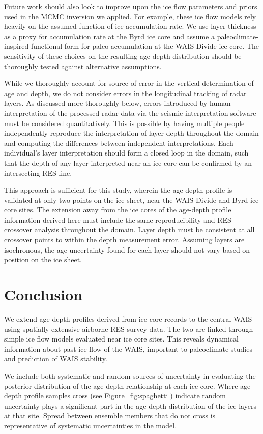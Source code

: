\documentclass[12pt]{article}
\begin{document}
Future work should also look to improve upon the ice flow parameters and priors used in the MCMC inversion we applied. For example, these ice flow models rely heavily on the assumed function of ice accumulation rate. We use layer thickness as a proxy for accumulation rate at the Byrd ice core and assume a paleoclimate-inspired functional form for paleo accumulation at the WAIS Divide ice core. The sensitivity of these choices on the resulting age-depth distribution should be thoroughly tested against alternative assumptions.

While we thoroughly account for source of error in the vertical determination of age and depth, we do not consider errors in the longitudinal tracking of radar layers. As discussed more thoroughly below, errors introduced by human interpretation of the processed radar data via the seismic interpretation software must be considered quantitatively. This is possible by having multiple people independently reproduce the interpretation of layer depth throughout the domain and computing the differences between independent interpretations. Each individual's layer interpretation should form a closed loop in the domain, such that the depth of any layer interpreted near an ice core can be confirmed by an intersecting RES line. 

This approach is sufficient for this study, wherein the age-depth profile is validated at only two points on the ice sheet, near the WAIS Divide and Byrd ice core sites.  The extension away from the ice cores of the age-depth profile information derived here  must include the same reproducibility and RES crossover analysis throughout the domain. Layer depth must be consistent at all crossover points to within the depth measurement error. Assuming layers are isochronous, the age uncertainty found for each layer should not vary based on position on the ice sheet.

\section{Conclusion}

We extend age-depth profiles derived from ice core records to the central WAIS using spatially extensive airborne RES survey data. The two are linked through simple ice flow models evaluated near ice core sites. This reveals dynamical information about past ice flow of the WAIS, important to paleoclimate studies and prediction of WAIS stability.

We include both systematic and random sources of uncertainty in evaluating the posterior distribution of the age-depth relationship at each ice core. Where age-depth profile samples cross (see Figure~\ref{fig:spaghetti}) indicate random uncertainty plays a significant part in the age-depth distribution of the ice layers at that site. Spread between ensemble members that do not cross is representative of systematic uncertainties in the model. 
\end{document}
